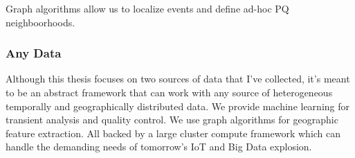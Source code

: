 Graph algorithms allow us to localize events and define ad-hoc PQ neighboorhoods.

\subsubsection{Any Data}
Although this thesis focuses on two sources of data that I've collected, it's meant to be an abstract framework that can work with any source of heterogeneous temporally and geographically distributed data. We provide machine learning for transient analysis and quality control. We use graph algorithms for geographic feature extraction. All backed by a large cluster compute framework which can handle the demanding needs of tomorrow's IoT and Big Data explosion.